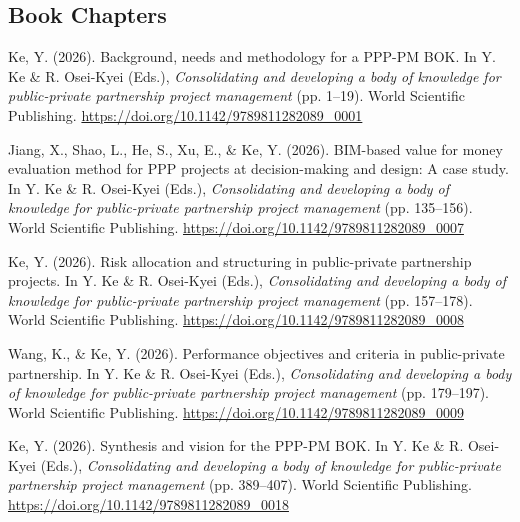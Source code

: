 \documentclass[11pt,a4paper]{report} %
\begin{document}
    \subsection*{Book Chapters}

    \begin{tablist}

        \item[2026] \tab{}Ke, Y. (2026). Background, needs and methodology for a PPP-PM BOK. In Y. Ke \& R. Osei-Kyei (Eds.), \textit{Consolidating and developing a body of knowledge for public-private partnership project management} (pp. 1--19). World Scientific Publishing. \href{https://doi.org/10.1142/9789811282089_0001}{https://doi.org/10.1142/9789811282089\_0001}
        
        \item[2026] \tab{}Jiang, X., Shao, L., He, S., Xu, E., \& Ke, Y. (2026). BIM-based value for money evaluation method for PPP projects at decision-making and design: A case study. In Y. Ke \& R. Osei-Kyei (Eds.), \textit{Consolidating and developing a body of knowledge for public-private partnership project management} (pp. 135--156). World Scientific Publishing. \href{https://doi.org/10.1142/9789811282089_0007}{https://doi.org/10.1142/9789811282089\_0007}
        
        \item[2026] \tab{}Ke, Y. (2026). Risk allocation and structuring in public-private partnership projects. In Y. Ke \& R. Osei-Kyei (Eds.), \textit{Consolidating and developing a body of knowledge for public-private partnership project management} (pp. 157--178). World Scientific Publishing. \href{https://doi.org/10.1142/9789811282089_0008}{https://doi.org/10.1142/9789811282089\_0008}
        
        \item[2026] \tab{}Wang, K., \& Ke, Y. (2026). Performance objectives and criteria in public-private partnership. In Y. Ke \& R. Osei-Kyei (Eds.), \textit{Consolidating and developing a body of knowledge for public-private partnership project management} (pp. 179--197). World Scientific Publishing. \href{https://doi.org/10.1142/9789811282089_0009}{https://doi.org/10.1142/9789811282089\_0009}
        
        \item[2026] \tab{}Ke, Y. (2026). Synthesis and vision for the PPP-PM BOK. In Y. Ke \& R. Osei-Kyei (Eds.), \textit{Consolidating and developing a body of knowledge for public-private partnership project management} (pp. 389--407). World Scientific Publishing. \href{https://doi.org/10.1142/9789811282089_0018}{https://doi.org/10.1142/9789811282089\_0018}
        

\end{tablist}
\end{document}
